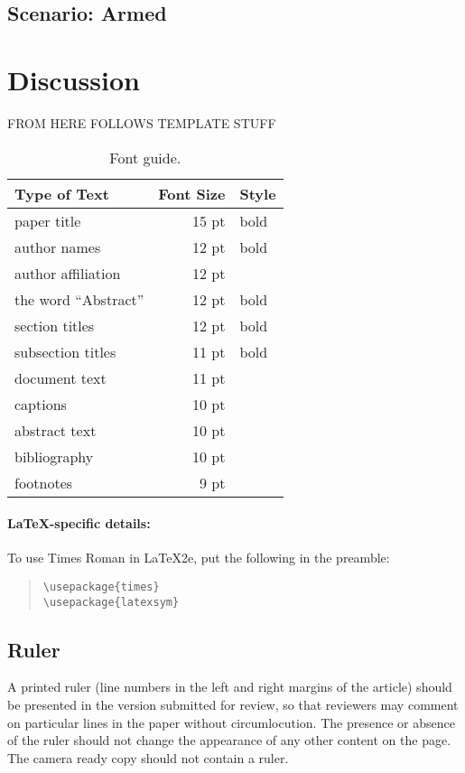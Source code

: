 \documentclass[11pt,a4paper]{article}
\begin{document}
\subsection{Scenario: Armed}
\label{sec:arms}

\section{Discussion}
\label{sec:discussion}

FROM HERE FOLLOWS TEMPLATE STUFF

\begin{table}
\centering
\begin{tabular}{lrl}
\hline \textbf{Type of Text} & \textbf{Font Size} & \textbf{Style} \\ \hline
paper title & 15 pt & bold \\
author names & 12 pt & bold \\
author affiliation & 12 pt & \\
the word ``Abstract'' & 12 pt & bold \\
section titles & 12 pt & bold \\
subsection titles & 11 pt & bold \\
document text & 11 pt  &\\
captions & 10 pt & \\
abstract text & 10 pt & \\
bibliography & 10 pt & \\
footnotes & 9 pt & \\
\hline
\end{tabular}
\caption{\label{font-table} Font guide. }
\end{table}

\paragraph{\LaTeX-specific details:}
To use Times Roman in \LaTeX2e{}, put the following in the preamble:
\begin{quote}
\small
\begin{verbatim}
\usepackage{times}
\usepackage{latexsym}
\end{verbatim}
\end{quote}


\subsection{Ruler}
A printed ruler (line numbers in the left and right margins of the article) should be presented in the version submitted for review, so that reviewers may comment on particular lines in the paper without circumlocution.
The presence or absence of the ruler should not change the appearance of any other content on the page.
The camera ready copy should not contain a ruler.
\end{document}
